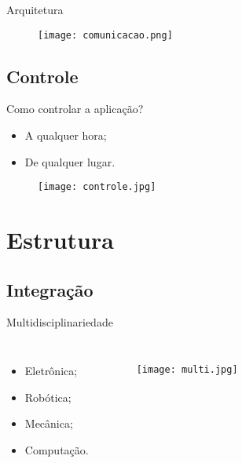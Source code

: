 \begin{frame}{Arquitetura}
	\begin{figure}[H]
		\texttt{[image: comunicacao.png]}\footnotemark
	\end{figure}
	
\end{frame}

\subsection*{Controle}
\begin{frame}{Como controlar a aplicação?}
	\begin{itemize}
		\item A qualquer hora;
		\item De qualquer lugar.
	\end{itemize}
	
		\begin{figure}[H]
			\texttt{[image: controle.jpg]}\footnotemark
		\end{figure}
		
\end{frame}

\section{Estrutura}
\label{sec:estrutura}

\subsection*{Integração}
\begin{frame}{Multidisciplinariedade}
	\begin{columns}
		\begin{itemize}
			\item Eletrônica;
			\item Robótica;
			\item Mecânica;
			\item Computação.
		\end{itemize}
		
		\begin{figure}[H]
			\texttt{[image: multi.jpg]}\footnotemark
		\end{figure}
	\end{columns}
\end{frame}

